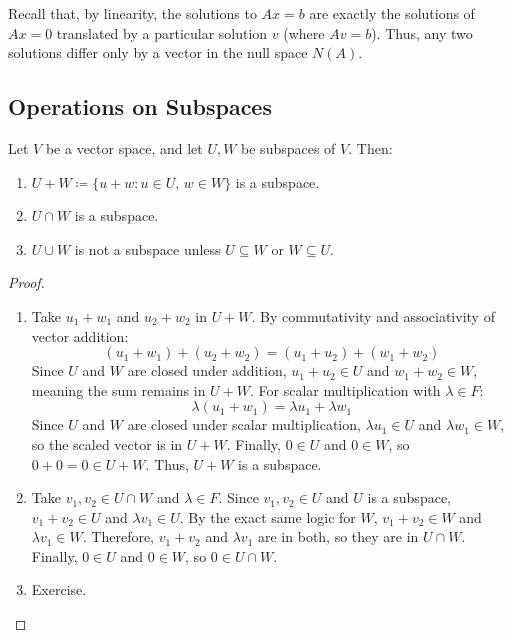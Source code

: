 \documentclass[../linear_algebra_and_groups.tex]{subfiles}
\begin{document}
\begin{remark}
    Recall that, by linearity, the solutions to $Ax=b$ are exactly the solutions of $Ax=0$ translated by a particular solution $v$ (where $Av=b$). Thus, any two solutions differ only by a vector in the null space $N(A)$.
\end{remark}

\subsection{Operations on Subspaces}


\begin{proposition}
    \begin{shaded*}
        Let $V$ be a vector space, and let $U,W$ be subspaces of $V$. Then:
        \begin{enumerate}
            \item[1.] $U+W \coloneqq \{u+w : u\in U,\, w\in W\}$ is a subspace.
            \item[2.] $U\cap W$ is a subspace.
            \item[3.] $U\cup W$ is not a subspace unless $U\subseteq W$ or $W\subseteq U$.
        \end{enumerate}
    \end{shaded*}
\end{proposition}
\begin{proof}
    \begin{enumerate}
        \item[1.]Take $u_1+w_1$ and $u_2+w_2$ in $U+W$. By commutativity and associativity of vector addition:
    \[ (u_1+w_1)+(u_2+w_2) = (u_1+u_2)+(w_1+w_2) \]
    Since $U$ and $W$ are closed under addition, $u_1+u_2 \in U$ and $w_1+w_2 \in W$, meaning the sum remains in $U+W$. 
    For scalar multiplication with $\lambda \in F$:
    \[ \lambda(u_1+w_1) = \lambda u_1 + \lambda w_1 \]
    Since $U$ and $W$ are closed under scalar multiplication, $\lambda u_1 \in U$ and $\lambda w_1 \in W$, so the scaled vector is in $U+W$. 
    Finally, $0 \in U$ and $0 \in W$, so $0+0=0 \in U+W$. Thus, $U+W$ is a subspace.

    \item[2.] Take $v_1, v_2 \in U\cap W$ and $\lambda \in F$. Since $v_1, v_2 \in U$ and $U$ is a subspace, $v_1+v_2 \in U$ and $\lambda v_1 \in U$. By the exact same logic for $W$, $v_1+v_2 \in W$ and $\lambda v_1 \in W$. Therefore, $v_1+v_2$ and $\lambda v_1$ are in both, so they are in $U\cap W$. Finally, $0 \in U$ and $0 \in W$, so $0 \in U\cap W$.
    
    \item[3.] Exercise.\qedhere
    \end{enumerate}
\end{proof}
\end{document}
